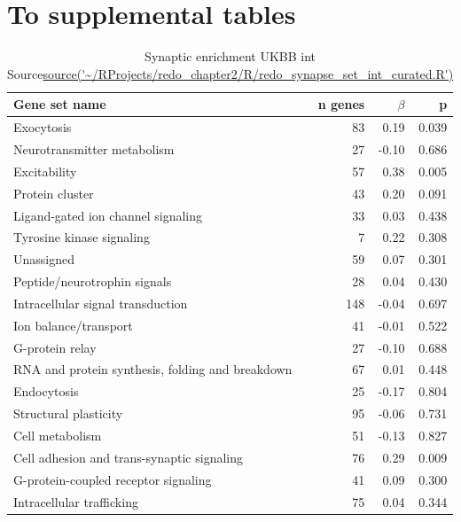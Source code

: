 \section{To supplemental tables}
\begin{table}[ht]
\centering
\begin{tabular}{lrrr}
  \toprule
Gene set name & n genes & $\beta$ & p \\ 
  \midrule
Exocytosis & 83 & 0.19 & 0.039 \\ 
  Neurotransmitter metabolism & 27 & -0.10 & 0.686 \\ 
  Excitability & 57 & 0.38 & 0.005 \\ 
  Protein cluster & 43 & 0.20 & 0.091 \\ 
  Ligand-gated ion channel signaling & 33 & 0.03 & 0.438 \\ 
  Tyrosine kinase signaling & 7 & 0.22 & 0.308 \\ 
  Unassigned & 59 & 0.07 & 0.301 \\ 
  Peptide/neurotrophin signals & 28 & 0.04 & 0.430 \\ 
  Intracellular signal transduction & 148 & -0.04 & 0.697 \\ 
  Ion balance/transport & 41 & -0.01 & 0.522 \\ 
  G-protein relay & 27 & -0.10 & 0.688 \\ 
  RNA and protein synthesis, folding and breakdown & 67 & 0.01 & 0.448 \\ 
  Endocytosis & 25 & -0.17 & 0.804 \\ 
  Structural plasticity & 95 & -0.06 & 0.731 \\ 
  Cell metabolism & 51 & -0.13 & 0.827 \\ 
  Cell adhesion and trans-synaptic signaling & 76 & 0.29 & 0.009 \\ 
  G-protein-coupled receptor signaling & 41 & 0.09 & 0.300 \\ 
  Intracellular trafficking & 75 & 0.04 & 0.344 \\ 
   \bottomrule
\end{tabular}
\caption{Synaptic enrichment UKBB int Source\url{source('~/RProjects/redo_chapter2/R/redo_synapse_set_int_curated.R')}} 
\label{tab:MAGMA enrichment of synaptic groups UKBBint}
\end{table}

